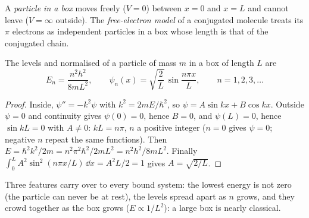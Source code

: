 \begin{definition}\label{def:b3:quantum-model-systems:box}
A \emph{particle in a box} moves freely ($V = 0$)
between $x = 0$ and $x = L$ and cannot leave ($V = \infty$ outside). The
\emph{free-electron model} of a conjugated
molecule treats its $\pi$ electrons as independent particles in a box whose
length is that of the conjugated chain.
\end{definition}

\begin{theorem}\label{thm:b3:quantum-model-systems:box}
The levels and normalised  of a particle of mass $m$ in a box
of length $L$ are
\[
E_n = \frac{n^2h^2}{8mL^2}, \qquad \psi_n(x) = \sqrt{\frac2L}\,\sin\frac{n\pi
x}{L}, \qquad n = 1, 2, 3, \dots
\]
\end{theorem}

\begin{proof}
Inside, $\psi'' = -k^2\psi$ with $k^2 = 2mE/\hbar^2$, so $\psi = A\sin kx +
B\cos kx$. Outside $\psi = 0$ and continuity gives $\psi(0) = 0$, hence $B =
0$, and $\psi(L) = 0$, hence $\sin kL = 0$ with $A \ne 0$: $kL = n\pi$, $n$ a
positive integer ($n = 0$ gives $\psi = 0$; negative $n$ repeat the same
functions). Then $E = \hbar^2k^2/2m = n^2\pi^2\hbar^2/2mL^2 = n^2h^2/8mL^2$.
Finally $\int_0^L A^2\sin^2(n\pi x/L)\,\dd x = A^2L/2 = 1$ gives $A =
\sqrt{2/L}$.
\end{proof}

Three features carry over to every bound system: the lowest energy is not
zero (the particle can never be at rest), the levels spread apart as $n$
grows, and they crowd together as the box grows ($E \propto 1/L^2$): a
large box is nearly classical.

